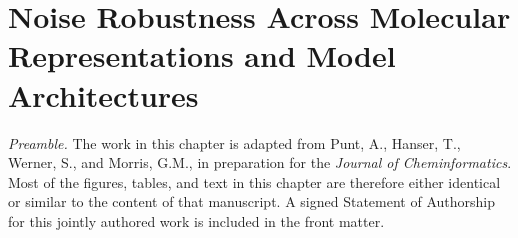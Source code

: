 \chapter{Noise Robustness Across Molecular Representations and Model Architectures}\label{chap:robustness}

\textit{Preamble.} The work in this chapter is adapted from Punt, A., Hanser, T., Werner, S., and Morris, G.M., in preparation for the \textit{Journal of Cheminformatics}. Most of the figures, tables, and text in this chapter are therefore either identical or similar to the content of that manuscript. A signed Statement of Authorship for this jointly authored work is included in the front matter.

